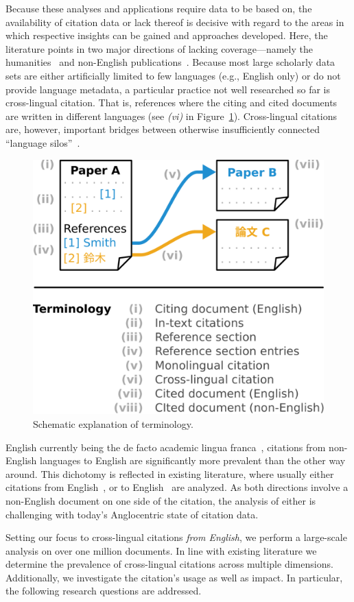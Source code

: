Because these analyses and applications require data to be based on, the availability of citation data or lack thereof is decisive with regard to the areas in which respective insights can be gained and approaches developed. Here, the literature points 
in two major directions of lacking coverage---namely the humanities~\cite{Colavizza2019,Kellsey2004} and non-English publications~\cite{Vera-Baceta2019,Liu2019,Moed2018,Moskaleva2019,MartinMartin2021}.
Because most large scholarly data sets are either artificially limited to few languages (e.g., English only) or do not provide language metadata,
a particular practice not well researched so far is cross-lingual citation. That is, references where the citing and cited documents are written in different languages (see \textit{(vi)} in Figure~\ref{fig:terminology}).
Cross-lingual citations are, however, important bridges between otherwise insufficiently connected ``language silos''~\cite{Shu2019,Moskaleva2019}.

\begin{figure}[tb]
\centering
\includegraphics[width=0.5\linewidth]{figures/ref_xling/terminology_with_text_twocolumn.pdf}
\caption{Schematic explanation of terminology.} \label{fig:terminology}
\end{figure}

English currently being the de facto academic lingua franca~\cite{Montgomery2013}, citations from non-English languages to English are significantly more prevalent than the other way around. This dichotomy is reflected in existing literature, where usually either citations from English~\cite{Kellsey2004,Lillis2010}, or to English~\cite{Tang2014,Jiang2018,Jiang2018b,Schrader2019} are analyzed. As both directions involve a non-English document on one side of the citation, the analysis of either is challenging with today's Anglocentric state of citation data.

Setting our focus to cross-lingual citations \emph{from English}, we perform a large-scale analysis on over one million documents.
In line with existing literature we determine the prevalence of cross-lingual citations across multiple dimensions. Additionally, we investigate the citation's usage as well as impact. In particular, the following research questions are addressed.

